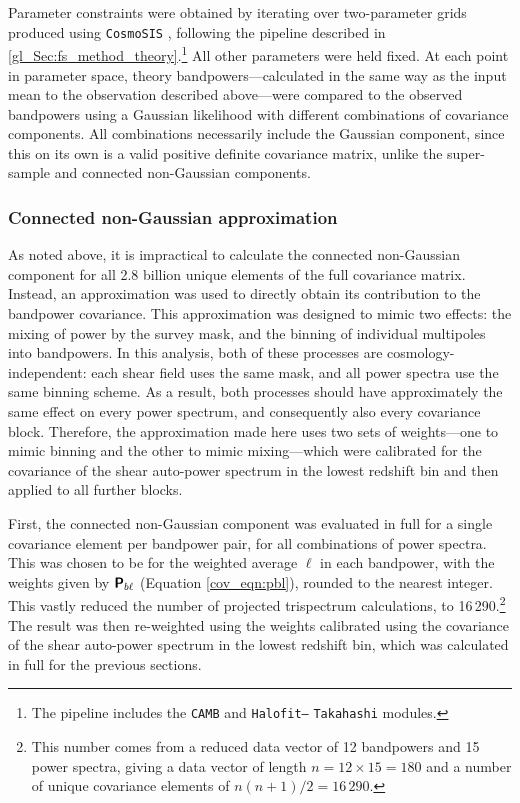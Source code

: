 Parameter constraints were obtained by iterating over two-parameter grids produced using \texttt{CosmoSIS} \citep{Zuntz2015}, following the pipeline described in \autoref{gl_Sec:fs_method_theory}.\footnote{The pipeline includes the \texttt{CAMB} \citep{Lewis2000, Howlett2012} and \texttt{Halofit--} \texttt{Takahashi} \citep{Smith2003, Takahashi2012} modules.}
All other parameters were held fixed.
At each point in parameter space, theory bandpowers---calculated in the same way as the input mean to the observation described above---were compared to the observed bandpowers using a Gaussian likelihood with different combinations of covariance components.
All combinations necessarily include the Gaussian component, since this on its own is a valid positive definite covariance matrix, unlike the super-sample and connected non-Gaussian components.

\subsubsection{Connected non-Gaussian approximation}
\label{cov_sec:cng_approx}

As noted above, it is impractical to calculate the connected non-Gaussian component for all 2.8 billion unique elements of the full covariance matrix. Instead, an approximation was used to directly obtain its contribution to the bandpower covariance.
This approximation was designed to mimic two effects: the mixing of power by the survey mask, and the binning of individual multipoles into bandpowers. In this analysis, both of these processes are cosmology-independent: each shear field uses the same mask, and all power spectra use the same binning scheme. As a result, both processes should have approximately the same effect on every power spectrum, and consequently also every covariance block. Therefore, the approximation made here uses two sets of weights---one to mimic binning and the other to mimic mixing---which were calibrated for the covariance of the shear auto-power spectrum in the lowest redshift bin and then applied to all further blocks.

First, the connected non-Gaussian component was evaluated in full for a single covariance element per bandpower pair, for all combinations of power spectra. This was chosen to be for the weighted average $\ell$ in each bandpower, with the weights given by $\bm{\mathsf{P}}_{b \ell}$ (Equation \ref{cov_eqn:pbl}), rounded to the nearest integer. This vastly reduced the number of projected trispectrum calculations, to 16\,290.\footnote{This number comes from a reduced data vector of 12 bandpowers and 15 power spectra, giving a data vector of length $n = 12 \times 15 = 180$ and a number of unique covariance elements of $n \left( n + 1 \right) / 2 = 16\,290$.}
The result was then re-weighted using the weights calibrated using the covariance of the shear auto-power spectrum in the lowest redshift bin, which was calculated in full for the previous sections.

